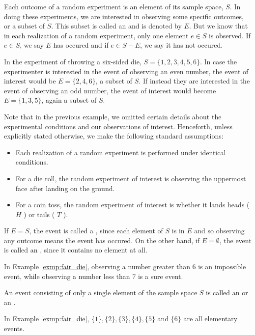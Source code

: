 Each outcome of a random experiment is an element of its sample space, \( S \).
In doing these experiments, we are interested in observing some specific outcomes, or a subset of \( S \).
This subset is called an  and is denoted by \( E \).
But we know that in each realization of a random experiment, only one element \( e \in S \) is observed.
If \( e \in S \), we say \( E \) has occured and if \( e \in S-E \), we say it has not occured.
\begin{exmp}\label{exmp:fair_die}
	In the experiment of throwing a six-sided die, \( S = \{ 1, 2, 3, 4, 5, 6 \} \).
	In case the experimenter is interested in the event of observing an even number, the event of interest would be \( E = \{ 2, 4, 6 \} \), a subset of \( S \).
	If instead they are interested in the event of observing an odd number, the event of interest would become \( E = \{ 1, 3, 5 \} \), again a subset of \( S \).
\end{exmp}
Note that in the previous example, we omitted certain details about the experimental conditions and our observations of interest.
Henceforth, unless explicitly stated otherwise, we make the following standard assumptions:
\begin{itemize}
	\item Each realization of a random experiment is performed under identical conditions.
	\item For a die roll, the random experiment of interest is observing the uppermost face after landing on the ground.
	\item For a coin toss, the random experiment of interest is whether it lands heads ( \( H \) ) or tails ( \( T \) ).
\end{itemize}
If \( E = S \), the event is called a , since each element of \( S \) is in \( E \) and so observing any outcome means the event has occured.
On the other hand, if \( E = \emptyset \), the event is called an , since it contains no element at all.
\begin{exmp}
	In Example \autoref{exmp:fair_die}, observing a number greater than 6 is an impossible event, while observing a number less than 7 is a sure event.
\end{exmp}
An event consisting of only a single element of the sample space \( S \) is called an  or an .
\begin{exmp}
	In Example \autoref{exmp:fair_die}, \( \{ 1 \}, \{ 2 \}, \{ 3 \}, \{ 4 \}, \{ 5 \} \) and \( \{ 6 \} \) are all elementary events.
\end{exmp}
